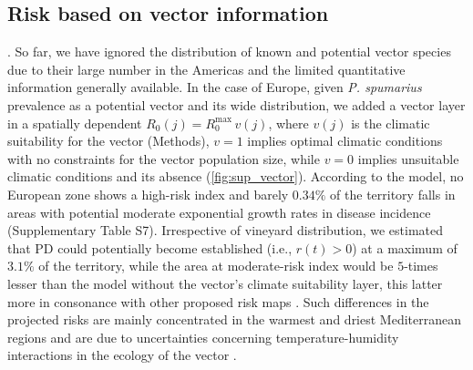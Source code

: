     \subsection{Risk based on vector information}. So far, we have ignored the
    distribution of known and potential vector species due to their large
    number in
    the Americas and the limited quantitative information generally available.
    In
    the case of Europe, given \textit{P. spumarius} prevalence as a potential
    vector and its wide distribution, we added	a vector layer in a spatially
    dependent $R_0(j) = R_0^{\textrm{max}}\, v(j)$, where $v(j)$ is the
    climatic
    suitability for the vector (Methods), $v=1$ implies optimal climatic
    conditions
    with no constraints for the vector population size, while $v=0$ implies
    unsuitable climatic conditions and its absence (\cref{fig:sup_vector}).
    According to the model, no European zone shows a high-risk index and barely
$0.34\%$ of the territory falls in areas with potential moderate exponential
    growth rates in disease incidence (Supplementary Table S7). Irrespective of
    vineyard distribution, we estimated that PD could potentially become
    established (i.e., $r(t) > 0$) at a maximum of $3.1\%$ of the territory,
    while
    the area at moderate-risk index would be $5$-times lesser than the model
    without the vector's climate suitability layer, this latter more in
    consonance
    with other proposed risk maps \cite{Godefroid2019,Bragard2019}. Such
    differences in the projected risks are mainly concentrated in the warmest
    and
    driest Mediterranean regions and are due to uncertainties concerning
    temperature-humidity interactions in the ecology of the vector
    \cite{Godefroid2021}.

